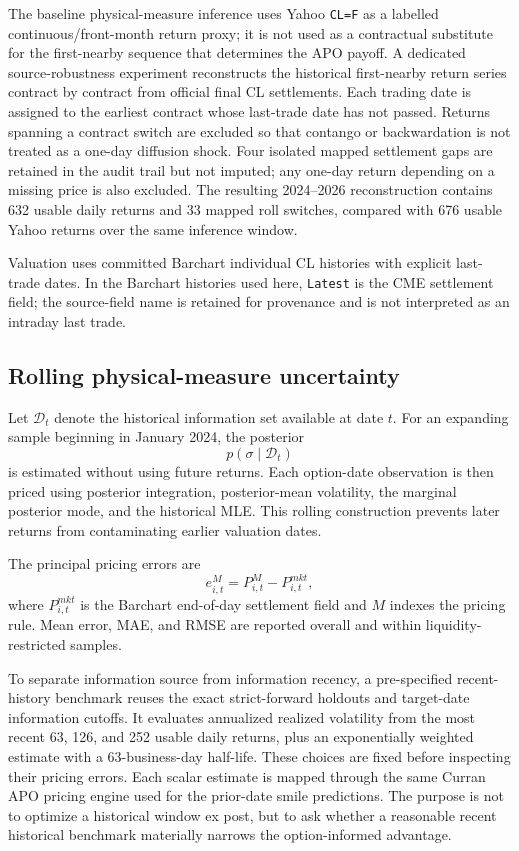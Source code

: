 The baseline physical-measure inference uses Yahoo \texttt{CL=F} as a labelled continuous/front-month return proxy; it is not used as a contractual substitute for the first-nearby sequence that determines the APO payoff. A dedicated source-robustness experiment reconstructs the historical first-nearby return series contract by contract from official final CL settlements. Each trading date is assigned to the earliest contract whose last-trade date has not passed. Returns spanning a contract switch are excluded so that contango or backwardation is not treated as a one-day diffusion shock. Four isolated mapped settlement gaps are retained in the audit trail but not imputed; any one-day return depending on a missing price is also excluded. The resulting 2024--2026 reconstruction contains 632 usable daily returns and 33 mapped roll switches, compared with 676 usable Yahoo returns over the same inference window.

Valuation uses committed Barchart individual CL histories with explicit last-trade dates. In the Barchart histories used here, \texttt{Latest} is the CME settlement field; the source-field name is retained for provenance and is not interpreted as an intraday last trade.

\subsection{Rolling physical-measure uncertainty}

Let $\mathcal D_t$ denote the historical information set available at date $t$. For an expanding sample beginning in January 2024, the posterior
\begin{equation}
 p(\sigma\mid\mathcal D_t)
\end{equation}
is estimated without using future returns. Each option-date observation is then priced using posterior integration, posterior-mean volatility, the marginal posterior mode, and the historical MLE. This rolling construction prevents later returns from contaminating earlier valuation dates.

The principal pricing errors are
\begin{equation}
 e^M_{i,t}=P^{M}_{i,t}-P^{mkt}_{i,t},
\end{equation}
where $P^{mkt}_{i,t}$ is the Barchart end-of-day settlement field and $M$ indexes the pricing rule. Mean error, MAE, and RMSE are reported overall and within liquidity-restricted samples.

To separate information source from information recency, a pre-specified recent-history benchmark reuses the exact strict-forward holdouts and target-date information cutoffs. It evaluates annualized realized volatility from the most recent 63, 126, and 252 usable daily returns, plus an exponentially weighted estimate with a 63-business-day half-life. These choices are fixed before inspecting their pricing errors. Each scalar estimate is mapped through the same Curran APO pricing engine used for the prior-date smile predictions. The purpose is not to optimize a historical window ex post, but to ask whether a reasonable recent historical benchmark materially narrows the option-informed advantage.

